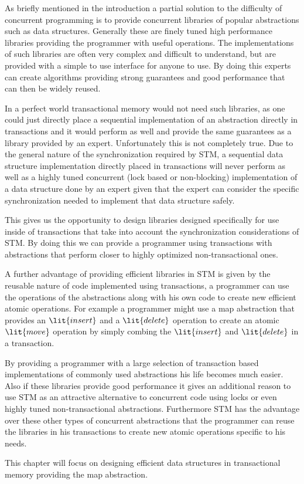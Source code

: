 
As briefly mentioned in the introduction a partial solution to the difficulty of concurrent programming
is to provide concurrent libraries of popular abstractions such as data structures.
Generally these are finely tuned high performance libraries
providing the programmer with useful operations.
The implementations of such libraries are often very complex
and difficult to understand, but are provided with a simple to use
interface for anyone to use.
By doing this experts can create algorithms providing strong guarantees
and good performance that can then be widely reused.

In a perfect world transactional memory would not need such libraries,
as one could just directly place a sequential implementation of an abstraction
directly in transactions and it would perform as well and provide the same
guarantees as a library provided by an expert.
Unfortunately this is not completely true.
Due to the general nature
of the synchronization required by STM, a sequential data structure implementation directly
placed in transactions will never perform as well as a highly tuned concurrent
(lock based or non-blocking) implementation of a data structure done by an expert
given that the expert can consider the specific synchronization needed to implement
that data structure safely.

This gives us the opportunity to design libraries designed specifically for use inside
of transactions that take into account the synchronization considerations
of STM.
By doing this we can provide a programmer using transactions with abstractions that perform closer
to highly optimized non-transactional ones.

A further advantage of providing efficient libraries in STM is given by the reusable nature of code implemented using
transactions, a programmer can use the operations of the abstractions along with his own code
to create new efficient atomic operations.
For example a programmer might use a map abstraction that provides an $\lit{insert}$ and a $\lit{delete}$ operation
to create an atomic $\lit{move}$ operation by simply combing the $\lit{insert}$ and $\lit{delete}$ in a transaction.

By providing a programmer with a large selection of transaction based implementations of commonly used abstractions
his life becomes much easier.
Also if these libraries provide good performance it gives an additional reason to use STM as an attractive alternative to
concurrent code using locks or even highly tuned non-transactional abstractions.
Furthermore STM has the advantage over these other types of concurrent abstractions that the programmer can reuse
the libraries in his transactions to create new atomic operations specific to his needs.

This chapter will focus on designing efficient data structures in transactional memory providing the map abstraction.